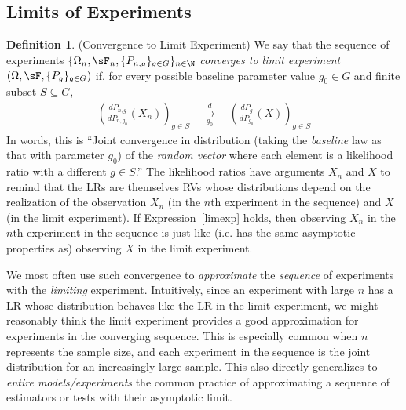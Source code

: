 \documentclass[12pt]{article}
\theoremstyle{plain}
\theoremstyle{definition}
\newtheorem{defn}[thm]{Definition}
\newtheorem{ex}[thm]{Example}
\theoremstyle{remark}
\newcommand{\dto}{\xrightarrow{d}}
\begin{document}




\clearpage
\subsection{Limits of Experiments}


\begin{defn}(Convergence to Limit Experiment)
\label{defn:limitexp}
We say that the sequence of experiments
$\{\Omega_n,\sF_n,\{P_{n,g}\}_{g\in G}\}_{n\in\N}$
\emph{converges to limit experiment}
$(\Omega,\sF,\{P_{g}\}_{g\in G})$ if,
for every possible baseline parameter value $g_0\in G$ and
finite subset $S\subseteq  G$,
\begin{align}
  \left(
  \frac{dP_{n,g}}{dP_{n,g_0}}(X_n)
  \right)_{g\in S}
  \quad\underset{g_0}{\dto}\quad
  \left(
  \frac{dP_{g}}{dP_{g_0}}(X)
  \right)_{g\in S}
  \label{limexp}
\end{align}
In words, this is ``Joint convergence in distribution
(taking the \emph{baseline} law as that with parameter $g_0$)
of the \emph{random vector} where each element is a likelihood ratio
with a different $g\in S$.''
The likelihood ratios have arguments $X_n$ and $X$ to remind that the
LRs are themselves RVs whose distributions depend on the realization of
the observation $X_n$ (in the $n$th experiment in the sequence) and $X$
(in the limit experiment).
If Expression~\ref{limexp} holds, then observing $X_n$ in the $n$th
experiment in the sequence is just like (i.e. has the same asymptotic
properties as) observing $X$ in the limit experiment.

We most often use such convergence to \emph{approximate} the
\emph{sequence} of experiments with the \emph{limiting} experiment.
Intuitively, since an experiment with large $n$ has a LR whose
distribution behaves like the LR in the limit experiment, we might
reasonably think the limit experiment provides a good approximation for
experiments in the converging sequence.
This is especially common when $n$ represents the sample size, and each
experiment in the sequence is the joint distribution for an increasingly
large sample.
This also directly generalizes to \emph{entire models/experiments} the
common practice of approximating a sequence of estimators or tests with
their asymptotic limit.
\end{defn}
\end{document}

